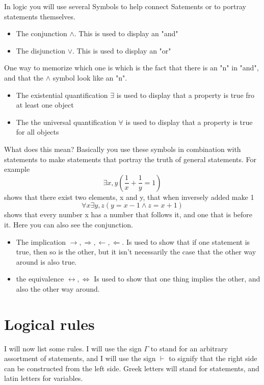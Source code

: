 In logic you will use several Symbols to help connect Satements or to portray statements themselves.
\begin{itemize}
	\item[] The conjunction $\wedge$. This is used to display an "and"
	\item[] The disjunction $\vee$. This is used to display an "or"
\end{itemize}
One way to memorize which one is which is the fact that there is an "n" in "and", and that the $\wedge$ symbol look like an "n".
\begin{itemize}
	\item[] The existential quantification $\exists$ is used to display that a property is true fro at least one object
	\item[] The the universal quantification $\forall$ is used to display that a property is true for all objects
\end{itemize}
What does this mean? Basically you use these symbols in combination with statements to make statements that portray the truth of general statements. For example
\begin{equation}
	\exists x,y\left(\frac{1}{x} + \frac{1}{y} = 1\right) 
\end{equation}
shows that there exist two elements, x and y, that when inversely added make 1
\begin{equation}
	\forall x \exists y, z\left( y = x-1 \wedge z = x + 1\right) 
\end{equation}
shows that every number x has a number that follows it, and one that is before it. Here you can also see the conjunction.
\begin{itemize}
	\item[] The implication $\rightarrow, \Rightarrow, \leftarrow, \Leftarrow$. Is used to show that if one statement is true, then so is the other, but it isn't necessarily the case that the other way around is also true.
	\item[] the equivalence $\leftrightarrow, \Leftrightarrow$ Is used to show that one thing implies the other, and also the other way around.
\end{itemize}
\section{Logical rules}
I will now list some rules. I will use the sign $\Gamma$ to stand for an arbitrary assortment of statements, and I will use the sign $\vdash$ to signify that the right side can be constructed from the left side. Greek letters will stand for statements, and latin letters for variables.


